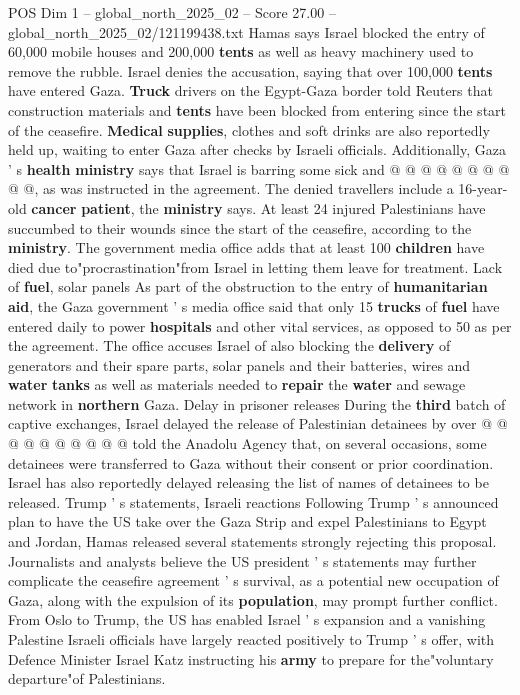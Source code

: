 \begin{textsample}{POS Dim 1 – global\_north\_2025\_02 – Score 27.00 – global\_north\_2025\_02/121199438.txt}
Hamas says Israel blocked the entry of 60,000 mobile houses and 200,000 \textbf{tents} as well as heavy machinery used to remove the rubble.
Israel denies the accusation, saying that over 100,000 \textbf{tents} have entered Gaza. \textbf{Truck} drivers on the Egypt-Gaza border told Reuters that construction materials and \textbf{tents} have been blocked from entering since the start of the ceasefire. \textbf{Medical} \textbf{supplies}, clothes and soft drinks are also reportedly held up, waiting to enter Gaza after checks by Israeli officials.
Additionally, Gaza ' s \textbf{health} \textbf{ministry} says that Israel is barring some sick and @ @ @ @ @ @ @ @ @ @, as was instructed in the agreement.
The denied travellers include a 16-year-old \textbf{cancer} \textbf{patient}, the \textbf{ministry} says.
At least 24 injured Palestinians have succumbed to their wounds since the start of the ceasefire, according to the \textbf{ministry}.
The government media office adds that at least 100 \textbf{children} have died due to"procrastination"from Israel in letting them leave for treatment.
Lack of \textbf{fuel}, solar panels As part of the obstruction to the entry of \textbf{humanitarian} \textbf{aid}, the Gaza government ' s media office said that only 15 \textbf{trucks} of \textbf{fuel} have entered daily to power \textbf{hospitals} and other vital services, as opposed to 50 as per the agreement.
The office accuses Israel of also blocking the \textbf{delivery} of generators and their spare parts, solar panels and their batteries, wires and \textbf{water} \textbf{tanks} as well as materials needed to \textbf{repair} the \textbf{water} and sewage network in \textbf{northern} Gaza.
Delay in prisoner releases During the \textbf{third} batch of captive exchanges, Israel delayed the release of Palestinian detainees by over @ @ @ @ @ @ @ @ @ @ told the Anadolu Agency that, on several occasions, some detainees were transferred to Gaza without their consent or prior coordination.
Israel has also reportedly delayed releasing the list of names of detainees to be released.
Trump ' s statements, Israeli reactions Following Trump ' s announced plan to have the US take over the Gaza Strip and expel Palestinians to Egypt and Jordan, Hamas released several statements strongly rejecting this proposal.
Journalists and analysts believe the US president ' s statements may further complicate the ceasefire agreement ' s survival, as a potential new occupation of Gaza, along with the expulsion of its \textbf{population}, may prompt further conflict.
From Oslo to Trump, the US has enabled Israel ' s expansion and a vanishing Palestine Israeli officials have largely reacted positively to Trump ' s offer, with Defence Minister Israel Katz instructing his \textbf{army} to prepare for the"voluntary departure"of Palestinians.

\end{textsample}
